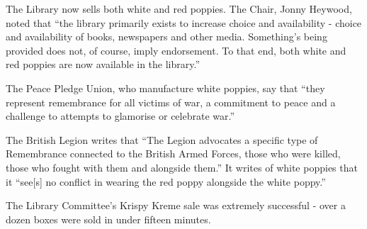 The Library now sells both white and red poppies. The Chair, Jonny
Heywood, noted that ``the library primarily exists to increase choice
and availability - choice and availability of books, newspapers and
other media. Something's being provided does not, of course, imply
endorsement. To that end, both white and red poppies are now available
in the library.''

The Peace Pledge Union, who manufacture white poppies, say that ``they
represent remembrance for all victims of war, a commitment to peace and
a challenge to attempts to glamorise or celebrate war.''

The British Legion writes that ``The Legion advocates a specific type of
Remembrance connected to the British Armed Forces, those who were
killed, those who fought with them and alongside them.'' It writes of
white poppies that it ``see{[}s{]} no conflict in wearing the red poppy
alongside the white poppy.''

The Library Committee's Krispy Kreme sale was extremely successful -
over a dozen boxes were sold in under fifteen minutes.
